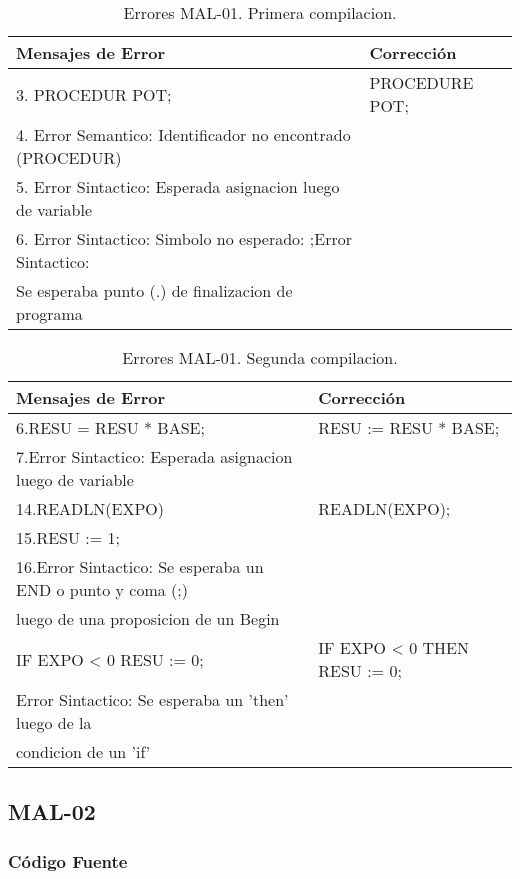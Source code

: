 \documentclass[a4paper,12pt]{article}
\begin{document}
\begin{table}[h!]
\centering
\begin{tabular}{|l|l|}
\hline
Mensajes de Error & Corrección\\
\hline
3. PROCEDUR POT;												& PROCEDURE POT;\\
4. Error Semantico: Identificador no encontrado (PROCEDUR)	&\\
5. Error Sintactico: Esperada asignacion luego de variable	&\\
6. Error Sintactico: Simbolo no esperado: ;Error Sintactico: &\\
Se esperaba punto (.) de finalizacion de programa			&\\
\hline
\end{tabular}
\caption{Errores MAL-01. Primera compilacion.}
\label{MAL-01-1}
\end{table}

\begin{table}[h!]
\centering
\begin{tabular}{|l|l|}
\hline
Mensajes de Error & Corrección\\
\hline
6.RESU = RESU * BASE;										& RESU := RESU * BASE;\\
7.Error Sintactico: Esperada asignacion luego de variable		&\\
\hline
14.READLN(EXPO)												& READLN(EXPO);\\
15.RESU := 1;												&\\
16.Error Sintactico: Se esperaba un END o punto y coma (;) 	&\\
luego de una proposicion de un Begin							& \\
\hline
IF EXPO < 0  RESU := 0;										& IF EXPO < 0 THEN RESU := 0;\\
Error Sintactico: Se esperaba un 'then' luego de la 			&\\
condicion de un 'if'											& \\
\hline
\end{tabular}
\caption{Errores MAL-01. Segunda compilacion.}
\label{MAL-01-2}
\end{table}

\subsection{MAL-02}
\subsubsection{Código Fuente}

\end{document}
